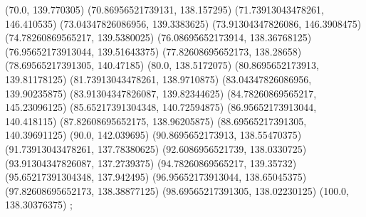 {{{		(70.0, 139.770305)
		(70.86956521739131, 138.157295)
		(71.73913043478261, 146.410535)
		(73.04347826086956, 139.3383625)
		(73.91304347826086, 146.3908475)
		(74.78260869565217, 139.5380025)
		(76.08695652173914, 138.36768125)
		(76.95652173913044, 139.51643375)
		(77.82608695652173, 138.28658)
		(78.69565217391305, 140.47185)
		(80.0, 138.5172075)
		(80.8695652173913, 139.81178125)
		(81.73913043478261, 138.9710875)
		(83.04347826086956, 139.90235875)
		(83.91304347826087, 139.82344625)
		(84.78260869565217, 145.23096125)
		(85.65217391304348, 140.72594875)
		(86.95652173913044, 140.418115)
		(87.82608695652175, 138.96205875)
		(88.69565217391305, 140.39691125)
		(90.0, 142.039695)
		(90.8695652173913, 138.55470375)
		(91.73913043478261, 137.78380625)
		(92.6086956521739, 138.0330725)
		(93.91304347826087, 137.2739375)
		(94.78260869565217, 139.35732)
		(95.65217391304348, 137.942495)
		(96.95652173913044, 138.65045375)
		(97.82608695652173, 138.38877125)
		(98.69565217391305, 138.02230125)
		(100.0, 138.30376375)
	};

}}
